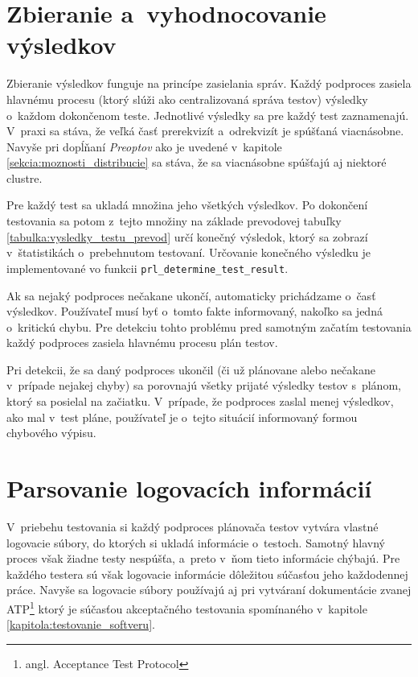 \section{Zbieranie a~vyhodnocovanie výsledkov}
\label{sekcia:zbieranie_vysledkov}
Zbieranie výsledkov funguje na princípe zasielania správ. 
Každý podproces zasiela hlavnému procesu (ktorý slúži ako centralizovaná
správa testov) výsledky o~každom dokončenom teste. Jednotlivé výsledky sa
pre každý test zaznamenajú. V~praxi sa stáva, že veľká časť prerekvizít
a~odrekvizít je spúšťaná viacnásobne. Navyše pri dopĺňaní \textit{Preoptov}
ako je uvedené v~kapitole \ref{sekcia:moznosti_distribucie} sa stáva, 
že sa viacnásobne spúšťajú aj niektoré clustre. 

Pre každý test sa ukladá množina jeho všetkých výsledkov. 
Po dokončení testovania sa potom z~tejto množiny na základe prevodovej
tabuľky \ref{tabulka:vysledky_testu_prevod} určí konečný výsledok,
ktorý sa zobrazí v~štatistikách o~prebehnutom testovaní.
Určovanie konečného výsledku je implementované vo funkcii 
\texttt{prl\_determine\_test\_result}.

Ak sa nejaký podproces nečakane ukončí, automaticky prichádzame 
o~časť výsledkov. Používateľ musí byť o~tomto fakte informovaný, 
nakoľko sa jedná o~kritickú chybu. Pre detekciu tohto problému pred 
samotným začatím testovania každý podproces zasiela hlavnému procesu 
plán testov.

Pri detekcii, že sa daný podproces ukončil (či už plánovane alebo 
nečakane v~prípade nejakej chyby) sa porovnajú všetky prijaté výsledky 
testov s~plánom, ktorý sa posielal na začiatku. V~prípade, že podproces 
zaslal menej výsledkov, ako mal v~test pláne, používateľ je o~tejto 
situácií informovaný formou chybového výpisu. 

\section{Parsovanie logovacích informácií}
\label{sekcia:parsovanie_logov}
V~priebehu testovania si každý podproces plánovača testov vytvára vlastné
logovacie súbory, do ktorých si ukladá informácie o~testoch.
Samotný hlavný proces však žiadne testy nespúšťa, a~preto v~ňom tieto 
informácie chýbajú. Pre každého testera sú však logovacie informácie 
dôležitou súčasťou jeho každodennej práce. Navyše sa logovacie súbory 
používajú aj pri vytváraní dokumentácie zvanej 
ATP\footnote{angl. Acceptance Test Protocol} ktorý je súčasťou
akceptačného testovania spomínaného v~kapitole 
\ref{kapitola:testovanie_softveru}.

